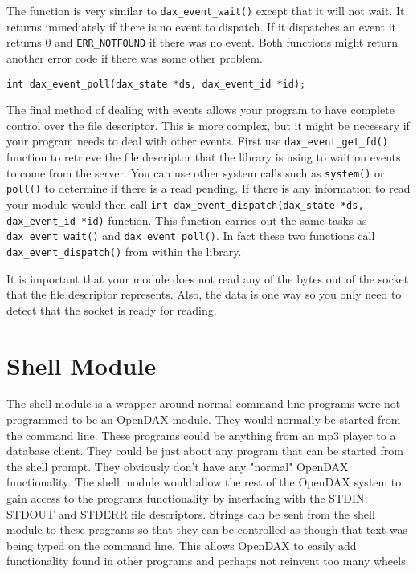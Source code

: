 The  function is very similar to \verb|dax_event_wait()| except that it will not wait.  It returns immediately if there is no event to dispatch.  If it dispatches an event it returns 0 and \verb|ERR_NOTFOUND| if there was no event.  Both functions might return another error code if there was some other problem.

\begin{verbatim}
int dax_event_poll(dax_state *ds, dax_event_id *id);
\end{verbatim}

The final method of dealing with events allows your program to have complete control over the file descriptor.  This is more complex, but it might be necessary if your program needs to deal with other events.  First use \texttt{dax\_event\_get\_fd()} function to retrieve the file descriptor that the library is using to wait on events to come from the server.  You can use other system calls such as \verb|system()| or \verb|poll()| to determine if there is a read pending.  If there is any information to read your module would then call \texttt{int dax\_event\_dispatch(dax\_state *ds, dax\_event\_id *id)} function.  This function carries out the same tasks as \texttt{dax\_event\_wait()} and \texttt{dax\_event\_poll()}.  In fact these two functions call \texttt{dax\_event\_dispatch()} from within the library.

It is important that your module does not read any of the bytes out of the socket that the file descriptor represents.  Also, the data is one way so you only need to detect that the socket is ready for reading.

\chapter{Shell Module}

The shell module is a wrapper around normal command line programs were not programmed to be an OpenDAX module.  They would normally be started from the command line.  These programs could be anything from an mp3 player to a database client.  They could be just about any program that can be started from the shell prompt.  They obviously don't have any "normal" OpenDAX functionality.  The shell module would allow the rest of the OpenDAX system to  gain access to the programs functionality by interfacing with the STDIN, STDOUT and STDERR file descriptors.  Strings can be sent from the shell module to these programs so that they can be controlled as though that text was being typed on the command line.  This allows OpenDAX to easily add functionality found in other programs and perhaps not reinvent too many wheels.

